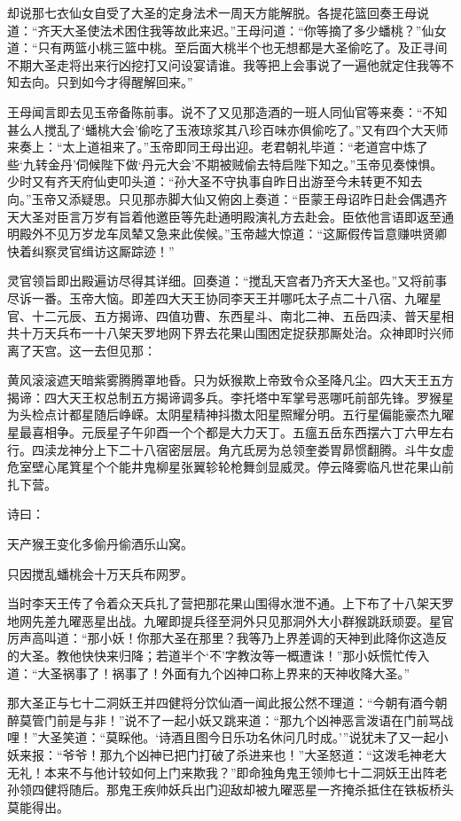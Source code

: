 \documentclass[12pt,UTF8]{ctexbook}
\begin{document}
{却说那七衣仙女自受了大圣的定身法术一周天方能解脱。各提花篮回奏王母说道：“齐天大圣使法术困住我等故此来迟。”王母问道：“你等摘了多少蟠桃？”仙女道：“只有两篮小桃三篮中桃。至后面大桃半个也无想都是大圣偷吃了。及正寻间不期大圣走将出来行凶挖打又问设宴请谁。我等把上会事说了一遍他就定住我等不知去向。只到如今才得醒解回来。”

王母闻言即去见玉帝备陈前事。说不了又见那造酒的一班人同仙官等来奏：“不知甚么人搅乱了‘蟠桃大会’偷吃了玉液琼浆其八珍百味亦俱偷吃了。”又有四个大天师来奏上：“太上道祖来了。”玉帝即同王母出迎。老君朝礼毕道：“老道宫中炼了些‘九转金丹’伺候陛下做‘丹元大会’不期被贼偷去特启陛下知之。”玉帝见奏悚惧。少时又有齐天府仙吏叩头道：“孙大圣不守执事自昨日出游至今未转更不知去向。”玉帝又添疑思。只见那赤脚大仙又俯囟上奏道：“臣蒙王母诏昨日赴会偶遇齐天大圣对臣言万岁有旨着他邀臣等先赴通明殿演礼方去赴会。臣依他言语即返至通明殿外不见万岁龙车凤辇又急来此俟候。”玉帝越大惊道：“这厮假传旨意赚哄贤卿快着纠察灵官缉访这厮踪迹！”

灵官领旨即出殿遍访尽得其详细。回奏道：“搅乱天宫者乃齐天大圣也。”又将前事尽诉一番。玉帝大恼。即差四大天王协同李天王并哪吒太子点二十八宿、九曜星官、十二元辰、五方揭谛、四值功曹、东西星斗、南北二神、五岳四渎、普天星相共十万天兵布一十八架天罗地网下界去花果山围困定捉获那厮处治。众神即时兴师离了天宫。这一去但见那：

黄风滚滚遮天暗紫雾腾腾罩地昏。只为妖猴欺上帝致令众圣降凡尘。四大天王五方揭谛：四大天王权总制五方揭谛调多兵。李托塔中军掌号恶哪吒前部先锋。罗猴星为头检点计都星随后峥嵘。太阴星精神抖擞太阳星照耀分明。五行星偏能豪杰九曜星最喜相争。元辰星子午卯酉一个个都是大力天丁。五瘟五岳东西摆六丁六甲左右行。四渎龙神分上下二十八宿密层层。角亢氐房为总领奎娄胃昴惯翻腾。斗牛女虚危室壁心尾箕星个个能井鬼柳星张翼轸轮枪舞剑显威灵。停云降雾临凡世花果山前扎下营。

诗曰：

天产猴王变化多偷丹偷酒乐山窝。

只因搅乱蟠桃会十万天兵布网罗。

当时李天王传了令着众天兵扎了营把那花果山围得水泄不通。上下布了十八架天罗地网先差九曜恶星出战。九曜即提兵径至洞外只见那洞外大小群猴跳跃顽耍。星官厉声高叫道：“那小妖！你那大圣在那里？我等乃上界差调的天神到此降你这造反的大圣。教他快快来归降；若道半个‘不’字教汝等一概遭诛！”那小妖慌忙传入道：“大圣祸事了！祸事了！外面有九个凶神口称上界来的天神收降大圣。”

那大圣正与七十二洞妖王并四健将分饮仙酒一闻此报公然不理道：“今朝有酒今朝醉莫管门前是与非！”说不了一起小妖又跳来道：“那九个凶神恶言泼语在门前骂战哩！”大圣笑道：“莫睬他。‘诗酒且图今日乐功名休问几时成。’”说犹未了又一起小妖来报：“爷爷！那九个凶神已把门打破了杀进来也！”大圣怒道：“这泼毛神老大无礼！本来不与他计较如何上门来欺我？”即命独角鬼王领帅七十二洞妖王出阵老孙领四健将随后。那鬼王疾帅妖兵出门迎敌却被九曜恶星一齐掩杀抵住在铁板桥头莫能得出。

}
\end{document}
